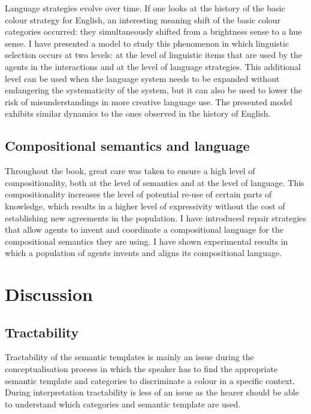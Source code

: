 Language strategies evolve over time. If one looks at the history of
the basic colour strategy for English, an interesting meaning shift of
the basic colour categories occurred: they simultaneously shifted from
a brightness sense to a hue sense. I have presented a model to study
this phenomenon in which linguistic selection occurs at two levels: at
the level of linguistic items that are used by the agents in the
interactions and at the level of language strategies. This additional
level can be used when the language system needs to be expanded
without endangering the systematicity of the system, but it can also
be used to lower the risk of misunderstandings in more creative
language use. The presented model exhibits similar dynamics to the
ones observed in the history of English.

\subsection{Compositional semantics and language}

Throughout the book, great care was taken to ensure a high level of
compositionality, both at the level of semantics and at the level of
language. This compositionality increases the level of potential
re-use of certain parts of knowledge, which results in a higher level
of expressivity without the cost of establishing new agreements in the
population. I have introduced repair strategies that allow agents to
invent and coordinate a compositional language for the compositional
semantics they are using. I have shown experimental results in which a
population of agents invents and aligns its compositional language.

\section{Discussion}

\subsection{Tractability}

Tractability of the semantic templates is mainly an issue during the
conceptualisation process in which the speaker has to find the
appropriate semantic template and categories to discriminate a colour
in a specific context. During interpretation tractability is less of
an issue as the hearer should be able to understand which categories and
semantic template are used. 

